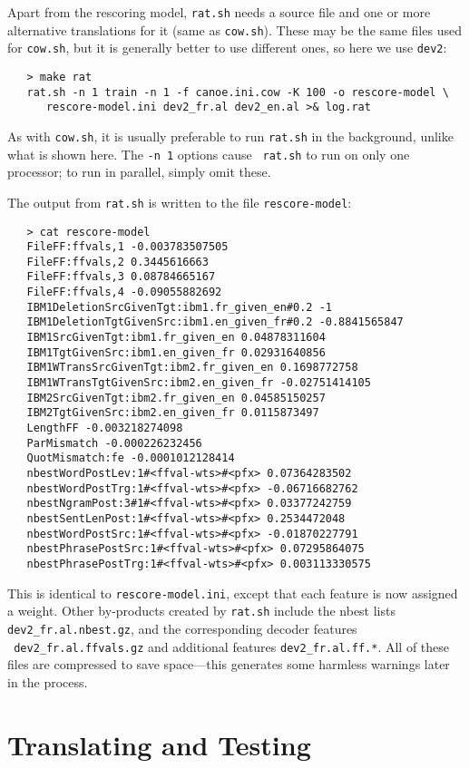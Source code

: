 \documentclass[11pt]{article}
\begin{document}
Apart from the rescoring model, {\tt rat.sh} needs a source file and one or
more alternative translations for it (same as {\tt cow.sh}). These may be the
same files used for {\tt cow.sh}, but it is generally better to use different
ones, so here we use {\tt dev2}:
\begin{verbatim}
   > make rat
   rat.sh -n 1 train -n 1 -f canoe.ini.cow -K 100 -o rescore-model \
      rescore-model.ini dev2_fr.al dev2_en.al >& log.rat
\end{verbatim}
As with {\tt cow.sh}, it is usually preferable to run {\tt rat.sh} in the
background, unlike what is shown here. The {\tt -n 1} options cause {\tt
rat.sh} to run on only one processor; to run in parallel, simply omit these.

The output from {\tt rat.sh} is written to the file {\tt rescore-model}:
\begin{verbatim}
   > cat rescore-model
   FileFF:ffvals,1 -0.003783507505
   FileFF:ffvals,2 0.3445616663
   FileFF:ffvals,3 0.08784665167
   FileFF:ffvals,4 -0.09055882692
   IBM1DeletionSrcGivenTgt:ibm1.fr_given_en#0.2 -1
   IBM1DeletionTgtGivenSrc:ibm1.en_given_fr#0.2 -0.8841565847
   IBM1SrcGivenTgt:ibm1.fr_given_en 0.04878311604
   IBM1TgtGivenSrc:ibm1.en_given_fr 0.02931640856
   IBM1WTransSrcGivenTgt:ibm2.fr_given_en 0.1698772758
   IBM1WTransTgtGivenSrc:ibm2.en_given_fr -0.02751414105
   IBM2SrcGivenTgt:ibm2.fr_given_en 0.04585150257
   IBM2TgtGivenSrc:ibm2.en_given_fr 0.0115873497
   LengthFF -0.003218274098
   ParMismatch -0.000226232456
   QuotMismatch:fe -0.0001012128414
   nbestWordPostLev:1#<ffval-wts>#<pfx> 0.07364283502
   nbestWordPostTrg:1#<ffval-wts>#<pfx> -0.06716682762
   nbestNgramPost:3#1#<ffval-wts>#<pfx> 0.03377242759
   nbestSentLenPost:1#<ffval-wts>#<pfx> 0.2534472048
   nbestWordPostSrc:1#<ffval-wts>#<pfx> -0.01870227791
   nbestPhrasePostSrc:1#<ffval-wts>#<pfx> 0.07295864075
   nbestPhrasePostTrg:1#<ffval-wts>#<pfx> 0.003113330575
\end{verbatim}
This is identical to {\tt rescore-model.ini}, except that each feature is now
assigned a weight. Other by-products created by {\tt rat.sh} include the nbest
lists {\tt dev2\_fr.al.nbest.gz}, and the corresponding decoder features \\{\tt
  dev2\_fr.al.ffvals.gz} and additional features {\tt dev2\_fr.al.ff.*}. All of
these files are compressed to save space---this generates some harmless
warnings later in the process.

\section{Translating and Testing} \label{TranslatingTesting}
\end{document}
